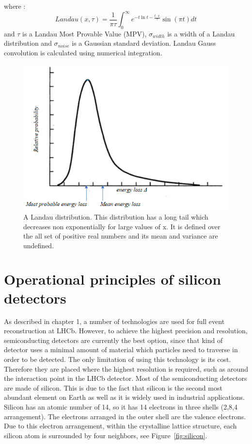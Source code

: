 where :
\begin{equation}
    Landau(x,\tau) =  \frac{1}{\pi \tau} \int_{0}^{\infty} e^{-t \ln t - \frac{t \cdot x}{\tau}} \sin{\left(\pi t\right)} dt
\end{equation}
and $\tau$ is a Landau Most Provable Value (MPV), $\sigma_{width}$ is a width of a Landau distribution and $\sigma_{noise}$ is a Gaussian standard deviation. Landau Gauss convolution is calculated using numerical integration. 


\begin{figure}[h]
\centering
\includegraphics{figures/landau-distribution.png}
\caption{A Landau distribution. This distribution has a long tail which decreases  non exponentially for large values of x. It is defined over the all set of positive real numbers and its mean and variance are undefined.  
\label{fig:landau_distribution}}
\end{figure}

\section{Operational principles of silicon detectors}

As described in chapter 1, a number of technologies are used for full event reconstruction at LHCb.  However, to achieve the highest precision and resolution, semiconducting detectors are currently the best option, since that kind of detector uses a minimal amount of material which particles need to traverse in order to be detected.  The only limitation of using this technology is its cost. Therefore they are placed where the highest resolution is required, such as around the interaction point in the LHCb detector. 
Most of the semiconducting detectors are made of silicon.  This is due to the fact that silicon is the second most abundant element on Earth as well as it is widely used in industrial applications. Silicon has an atomic number of 14, so it has 14 electrons in three shells (2,8,4 arrangement). The electrons arranged in the outer shell are the valence electrons.  Due to this electron arrangement, within the crystalline lattice structure, each silicon atom is surrounded by four neighbors, see Figure~\ref{fig:silicon}.  

